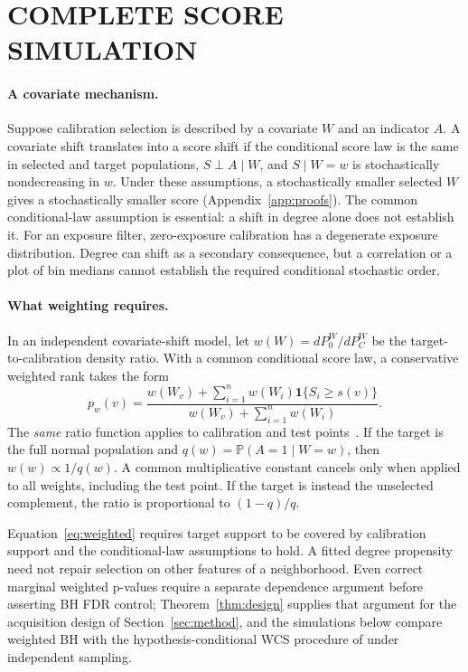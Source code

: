 \documentclass[twoside]{article}
\newcommand{\Prb}{\mathbb{P}}
\newcommand{\ind}{\mathbf{1}}
\begin{document}
\section{COMPLETE SCORE SIMULATION}
\label{app:simulation}
\paragraph{A covariate mechanism.}
Suppose calibration selection is described by a covariate $W$ and an indicator $A$. A covariate shift translates into a score shift if the conditional score law is the same in selected and target populations, $S\perp A\mid W$, and $S\mid W=w$ is stochastically nondecreasing in $w$. Under these assumptions, a stochastically smaller selected $W$ gives a stochastically smaller score (Appendix~\ref{app:proofs}). The common conditional-law assumption is essential: a shift in degree alone does not establish it. For an exposure filter, zero-exposure calibration has a degenerate exposure distribution. Degree can shift as a secondary consequence, but a correlation or a plot of bin medians cannot establish the required conditional stochastic order.

\paragraph{What weighting requires.}
In an independent covariate-shift model, let $w(W)=dP_0^W/dP_C^W$ be the target-to-calibration density ratio. With a common conditional score law, a conservative weighted rank takes the form
\begin{equation}
 p_w(v)=\frac{w(W_v)+\sum_{i=1}^n w(W_i)\ind\{S_i\ge s(v)\}}
 {w(W_v)+\sum_{i=1}^n w(W_i)}.
 \label{eq:weighted}
\end{equation}
The \emph{same} ratio function applies to calibration and test points~\citep{tibshirani2019conformal}. If the target is the full normal population and $q(w)=\Prb(A=1\mid W=w)$, then $w(w)\propto1/q(w)$. A common multiplicative constant cancels only when applied to all weights, including the test point. If the target is instead the unselected complement, the ratio is proportional to $(1-q)/q$.

Equation~\eqref{eq:weighted} requires target support to be covered by calibration support and the conditional-law assumptions to hold. A fitted degree propensity need not repair selection on other features of a neighborhood. Even correct marginal weighted p-values require a separate dependence argument before asserting BH FDR control; Theorem~\ref{thm:design} supplies that argument for the acquisition design of Section~\ref{sec:method}, and the simulations below compare weighted BH with the hypothesis-conditional WCS procedure of \citet{jin2026weighted} under independent sampling.
\end{document}
